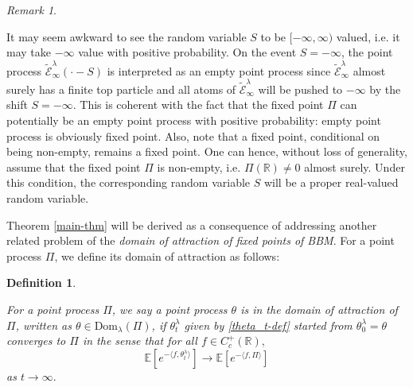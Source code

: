 \documentclass[a4paper,reqno]{amsart}%
\newcommand{\1}{\mathbf 1}
\theoremstyle{mine}
\numberwithin{theorem}{section}
\newtheorem{definition}[theorem]{Definition}
\numberwithin{equation}{section}
\theoremstyle{remark}
\newtheorem{remark}{Remark}
\begin{document}
\begin{remark} \label{infinite-S}

It may seem awkward to see the random variable $S$ to be $[-\infty, \infty)$ valued, i.e. it may take $-\infty$ value with positive probability. On the event $S= -\infty$, the point process $\widetilde{\mathcal E}_\infty^\lambda (\cdot - S)$ is interpreted as an empty point process since $\widetilde{\mathcal E}_\infty^\lambda$ almost surely has a finite top particle and all atoms of $\widetilde{\mathcal E}_\infty^\lambda$ will be pushed to $-\infty$ by the shift $S= -\infty$. This is coherent with the fact that the fixed point $\Pi$ can potentially be an empty point process with positive probability: empty point process is obviously fixed point. Also, note that a fixed point, conditional on being non-empty, remains a fixed point. One can hence, without loss of generality, assume that the fixed point $\Pi$ is non-empty, i.e. $\Pi(\mathbb{R}) \neq 0$ almost surely. Under this condition, the corresponding random variable $S$ will be a proper real-valued random variable. 

\end{remark}



\vspace{2mm}




Theorem \ref{main-thm} will be derived as a consequence of addressing another related problem of the \textit{domain of attraction of fixed points of BBM}. For a point process $\Pi$,
we define its domain of attraction as follows: 

\begin{definition}\label{Def_DOA}

    For a point process $\Pi$, we say a point process $\theta$ is in the domain of attraction of $\Pi$, written as  $ \theta \in \textrm{Dom}_{\lambda}(\Pi)$, if $\theta_t^\lambda$ given by \eqref{theta_t-def} started from $\theta_0^\lambda = \theta$ converges to $\Pi$ in the sense that for all $f \in C_c^+(\mathbb R),$ 
    \begin{equation}
        \mathbb E[e^{-\langle f , \theta_t^\lambda \rangle}]\longrightarrow \mathbb E[e^{-\langle f , \Pi \rangle}]
    \end{equation}
    as $t \to \infty.$
\end{definition}
\end{document}
